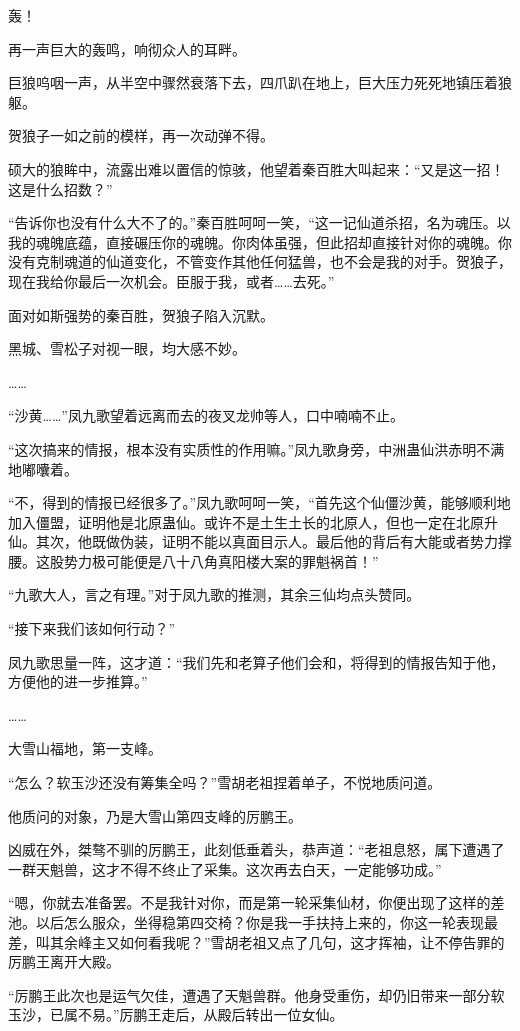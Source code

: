\begin{this_body}
轰！

再一声巨大的轰鸣，响彻众人的耳畔。

巨狼呜咽一声，从半空中骤然衰落下去，四爪趴在地上，巨大压力死死地镇压着狼躯。

贺狼子一如之前的模样，再一次动弹不得。

硕大的狼眸中，流露出难以置信的惊骇，他望着秦百胜大叫起来：“又是这一招！这是什么招数？”

“告诉你也没有什么大不了的。”秦百胜呵呵一笑，“这一记仙道杀招，名为魂压。以我的魂魄底蕴，直接碾压你的魂魄。你肉体虽强，但此招却直接针对你的魂魄。你没有克制魂道的仙道变化，不管变作其他任何猛兽，也不会是我的对手。贺狼子，现在我给你最后一次机会。臣服于我，或者……去死。”

面对如斯强势的秦百胜，贺狼子陷入沉默。

黑城、雪松子对视一眼，均大感不妙。

……

“沙黄……”凤九歌望着远离而去的夜叉龙帅等人，口中喃喃不止。

“这次搞来的情报，根本没有实质性的作用嘛。”凤九歌身旁，中洲蛊仙洪赤明不满地嘟囔着。

“不，得到的情报已经很多了。”凤九歌呵呵一笑，“首先这个仙僵沙黄，能够顺利地加入僵盟，证明他是北原蛊仙。或许不是土生土长的北原人，但也一定在北原升仙。其次，他既做伪装，证明不能以真面目示人。最后他的背后有大能或者势力撑腰。这股势力极可能便是八十八角真阳楼大案的罪魁祸首！”

“九歌大人，言之有理。”对于凤九歌的推测，其余三仙均点头赞同。

“接下来我们该如何行动？”

凤九歌思量一阵，这才道：“我们先和老算子他们会和，将得到的情报告知于他，方便他的进一步推算。”

……

大雪山福地，第一支峰。

“怎么？软玉沙还没有筹集全吗？”雪胡老祖捏着单子，不悦地质问道。

他质问的对象，乃是大雪山第四支峰的厉鹏王。

凶威在外，桀骜不驯的厉鹏王，此刻低垂着头，恭声道：“老祖息怒，属下遭遇了一群天魁兽，这才不得不终止了采集。这次再去白天，一定能够功成。”

“嗯，你就去准备罢。不是我针对你，而是第一轮采集仙材，你便出现了这样的差池。以后怎么服众，坐得稳第四交椅？你是我一手扶持上来的，你这一轮表现最差，叫其余峰主又如何看我呢？”雪胡老祖又点了几句，这才挥袖，让不停告罪的厉鹏王离开大殿。

“厉鹏王此次也是运气欠佳，遭遇了天魁兽群。他身受重伤，却仍旧带来一部分软玉沙，已属不易。”厉鹏王走后，从殿后转出一位女仙。


\end{this_body}
